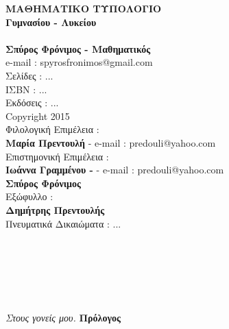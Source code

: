 \documentclass[twoside,10pt]{book}
\begin{document}
\begin{titlepage}
{{{\textbf{ΜΑΘΗΜΑΤΙΚΟ ΤΥΠΟΛΟΓΙΟ}\\\textbf{Γυμνασίου - Λυκείου}\\\\\noindent \textbf{Σπύρος Φρόνιμος - Μαθηματικός}\\e-mail : spyrosfronimos@gmail.com}\\[0.5\baselineskip]
Σελίδες : ...\\
ΙΣΒΝ : ...\\
Εκδόσεις : ...\\
\textcopyright Copyright 2015\\[2\baselineskip] %
{Φιλολογική Επιμέλεια :\\\textbf{Μαρία Πρεντουλή}}
{- e-mail : predouli@yahoo.com}\\[0.5\baselineskip]
{Επιστημονική Επιμέλεια :}\\
{\textbf{Ιωάννα Γραμμένου - }}{ - e-mail : predouli@yahoo.com}\\{\textbf{Σπύρος Φρόνιμος}}\\[0.5\baselineskip]
{Εξώφυλλο : \\\textbf{Δημήτρης Πρεντουλής}}\\[1\baselineskip] %

\vspace{.4\textheight} %
{Πνευματικά Δικαιώματα : ...}\\[\baselineskip]}}
\vspace*{2\baselineskip}
\newpage
\mbox{}\\\\\\\\\\\\
\hspace*{0.75\textwidth}
\textit{{\large Στους γονείς μου.}}
\newpage
\mbox{}
\newpage
\mbox{}
{\LARGE \textbf{Πρόλογος}}\\\\\\\\


\end{titlepage}
\end{document}
